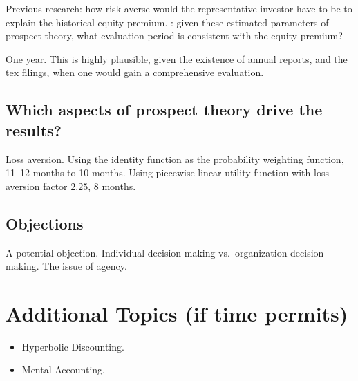 \documentclass[oneside,reqno,letterpaper]{amsart}
\begin{document}
Previous research: how risk averse would the representative investor have to be to explain the historical equity premium. 
\Textcite{Benartzi1995Myopic}: given these estimated parameters of prospect theory, what evaluation period is consistent with the equity premium? 

One year. This is highly plausible, given the existence of annual reports, and the tex filings, when one would gain a comprehensive evaluation. 


\subsection{Which aspects of prospect theory drive the results?}
Loss aversion. 
Using the identity function as the probability weighting function, 11--12 months to 10 months. 
Using piecewise linear utility function with loss aversion factor \(2.25\), 8 months.


\subsection{Objections}
A potential objection. 
Individual decision making vs.\ organization decision making. 
The issue of agency. 




\section{Additional Topics (if time permits)}
\begin{itemize}
  \item Hyperbolic Discounting. 
  \item Mental Accounting. 
\end{itemize}





\printbibliography
\end{document}
